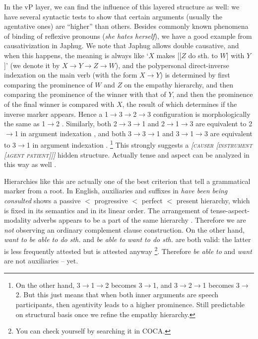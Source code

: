 \documentclass[a4paper, oneside, scheme=plain, 12pt]{article}
\newcommand*{\textto}{$\to$}
\newcommand*{\citesec}[1]{\S~{#1}}
\newcommand*{\citepage}[1]{p.~{#1}}
\newcommand{\form}[1]{\emph{#1}}
\newcommand*{\textlt}{$<$ }
\newcommand{\translate}[1]{`#1'}
\newcommand*{\category}[1]{\textsc{#1}}
\begin{document}
In the vP layer, we can find the influence of this layered structure as well:
we have several syntactic tests to show that certain arguments (usually the agentative ones)
are ``higher'' than others.
Besides commonly known phenomena of binding of reflexive pronouns (\form{she hates herself}),
we have a good example from causativization in Japhug.
We note that Japhug allows double causative,
and when this happens, the meaning is always like 
\translate{$X$ makes [[$Z$ do sth. to $W$] with $Y$]}
(we denote it by $X \to Y \to Z \to W$),
and the polypersonal direct-inverse indexation on the main verb (with the form $X \to Y$)
is determined by first comparing the prominence of $W$ and $Z$ on the empathy hierarchy,
and then comparing the prominence of the winner with that of $Y$,
and then the prominence of the final winner is compared with $X$,
the result of which determines if the inverse marker appears.
Hence a 1\textto 3\textto 2\textto 3 configuration
is morphologically the same as 1\textto 2
\citep[\citepage{848}, (67)]{jacques2021grammar}.
Similarly, both 2\textto 3\textto 1 and 2\textto 1\textto 3 
are equivalent to 2\textto 1 in argument indexation
\citep[\citepage{584}]{jacques2021grammar},
and both 3\textto 3\textto 1 and 3\textto 1\textto 3 
are equivalent to 3\textto 1 in argument indexation
\citep[\citepage{310}]{jacques2021grammar}.%
\footnote{
    On the other hand, 3\textto 1\textto 2 becomes 3\textto 1,
    and 3\textto 2\textto 1 becomes 3\textto 2.
    But this just means that when both inner arguments are speech participants,
    then agentivity leads to a higher prominence.
    Still predictable on structural basis
    once we refine the empathy hierarchy.
}
This strongly suggests a \form{[\category{causer} [\category{instrument} [\category{agent} \category{patient}]]]} hidden structure.
Actually tense and aspect can be analyzed in this way as well 
\citet[\citesec{7.4.1}]{wiltschko2014universal}.

Hierarchies like this are actually one of the best criterion that tell a grammatical marker from a root.
In English, auxiliaries and suffixes in \form{have been being consulted} 
shows a passive \textlt progressive \textlt perfect \textlt present hierarchy,
which is fixed in its semantics and in its linear order.
The arrangement of tense-aspect-modality adverbs appears to be a part of the same hierarchy \citep{cinque1999adverbs}.
Therefore we are \emph{not} observing an ordinary complement clause construction.
On the other hand, \form{want to be able to do sth.}
and \form{be able to want to do sth.} are both valid:
the latter is less frequently attested but is attested anyway%
\footnote{
    You can check yourself by searching it in COCA.
}.
Therefore \form{be able to} and \form{want} are not auxiliaries -- yet.
\end{document}
